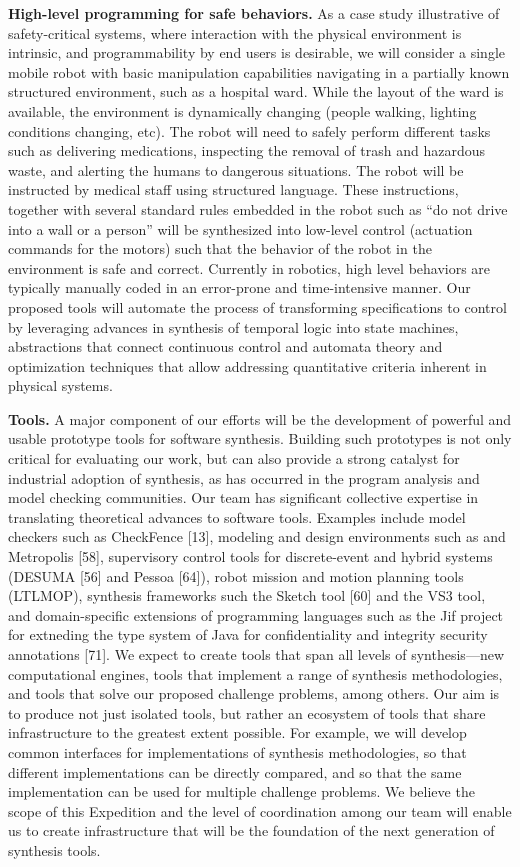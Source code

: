 \textbf{High-level programming for safe behaviors.} As a case study illustrative of safety-critical systems, where interaction with the physical environment is intrinsic, and programmability by end users is desirable, we will consider a single mobile robot with basic manipulation capabilities navigating in a partially known structured environment, such as a hospital ward. While the layout of the ward is available, the environment is dynamically changing (people walking, lighting conditions changing, etc). The robot will need to safely perform different tasks such as delivering medications, inspecting the removal of trash and hazardous waste, and alerting the humans to dangerous situations. The robot will be instructed by medical staff using structured language. These instructions, together with several standard rules embedded in the robot such as “do not drive into a wall or a person” will be synthesized into low-level control (actuation commands for the motors) such that the behavior of the robot in the environment is safe and correct. Currently in robotics, high level behaviors are typically manually coded in an error-prone and time-intensive manner. Our proposed tools will automate the process of transforming specifications to control by leveraging advances in synthesis of temporal logic into state machines, abstractions that connect continuous control and automata theory and optimization techniques that allow addressing quantitative criteria inherent in physical systems.



\textbf{Tools.} A major component of our efforts will be the development of powerful and usable prototype tools for software synthesis. Building such prototypes is not only critical for evaluating our work, but can also provide a strong catalyst for industrial adoption of synthesis, as has occurred in the program analysis and model checking communities. Our team has significant collective expertise in translating theoretical advances to software tools. Examples include model checkers such as CheckFence [13], modeling and design environments such as and Metropolis [58], supervisory control tools for discrete-event and hybrid systems (DESUMA [56] and Pessoa [64]), robot mission and motion planning tools (LTLMOP), synthesis frameworks such the Sketch tool [60] and the VS3 tool, and domain-specific extensions of programming languages such as the Jif project for extneding the type system of Java for confidentiality and integrity security annotations [71]. We expect to create tools that span all levels of synthesis—new computational engines, tools that implement a range of synthesis methodologies, and tools that solve our proposed challenge problems, among others. Our aim is to produce not just isolated tools, but rather an ecosystem of tools that share infrastructure to the greatest extent possible. For example, we will develop common interfaces for implementations of synthesis methodologies, so that different implementations can be directly compared, and so that the same implementation can be used for multiple challenge problems. We believe the scope of this Expedition and the level of coordination among our team will enable us to create infrastructure that will be the foundation of the next generation of synthesis tools.


